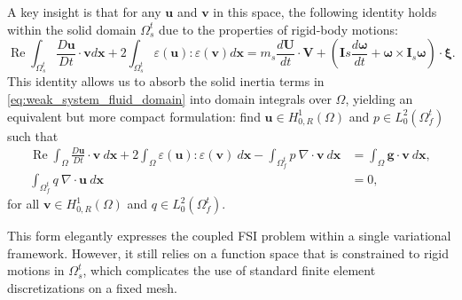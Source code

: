 \documentclass{article}
\newcommand{\bU}{{\mathbf{U}}}
\newcommand{\bx}{{\mathbf{x}}}
\newcommand{\bu}{{\mathbf{u}}}
\newcommand{\bv}{{\mathbf{v}}}
\newcommand{\Reynolds}{{\operatorname{Re}}}
\begin{document}
A key insight is that for any $\bu$ and $\bv$ in this space, the following identity holds within the solid domain $\Omega_s^t$ due to the properties of rigid-body motions:
\begin{equation}\label{eq:key_identity}
\Reynolds \int_{\Omega_s^t} \frac{D\bu}{Dt} \cdot \bv d\bx + 2 \int_{\Omega_s^t} \varepsilon(\bu) : \varepsilon(\bv) d\bx = m_s \frac{d\bU}{dt} \cdot \mathbf{V} + \left( \mathbf{I}s \frac{d\boldsymbol{\omega}}{dt} + \boldsymbol{\omega} \times \mathbf{I}_s \boldsymbol{\omega} \right) \cdot \boldsymbol{\xi}.
\end{equation}
This identity allows us to absorb the solid inertia terms in \eqref{eq:weak_system_fluid_domain} into domain integrals over $\Omega$, yielding an equivalent but more compact formulation: find $\bu \in H_{0,R}^1(\Omega)$ and $p \in L^2_0(\Omega_f^t)$ such that
\begin{equation}\label{eq:weak_system_unified_domain}
\begin{aligned}
\Reynolds\int_{\Omega} \frac{D\bu}{Dt}\cdot\bv\ d\bx + 2\int_{\Omega} \varepsilon(\bu):\varepsilon(\bv)\ d\bx - \int_{\Omega_f^t} p\ \nabla\cdot\bv\ d\bx &= \int_{\Omega} \mathbf{g}\cdot\bv\ d\bx,\\
\int_{\Omega_f^t} q\ \nabla\cdot\bu\ d\bx &= 0,
\end{aligned}
\end{equation}
for all $\bv \in H_{0,R}^1(\Omega)$ and $q \in L^2_0(\Omega_f^t)$.

This form elegantly expresses the coupled FSI problem within a single variational framework. However, it still relies on a function space that is constrained to rigid motions in $\Omega_s^t$, which complicates the use of standard finite element discretizations on a fixed mesh.
\end{document}
